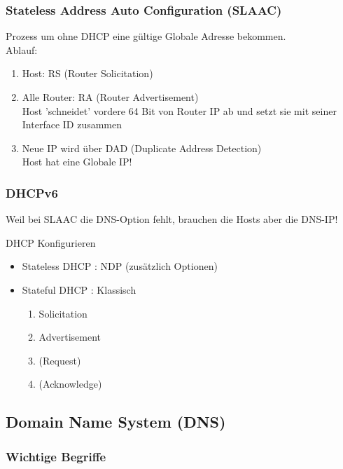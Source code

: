 \documentclass[10pt]{article}
\begin{document}
\subsubsection{Stateless Address Auto Configuration (SLAAC)}

Prozess um ohne DHCP eine gültige Globale Adresse bekommen.\\
Ablauf:
\begin{enumerate}
    \item Host: RS (Router Solicitation)
    \item Alle Router: RA (Router Advertisement)\\
        \textrightarrow\space Host 'schneidet' vordere 64 Bit von Router IP ab und setzt sie mit seiner Interface ID zusammen
    \item Neue IP wird über DAD (Duplicate Address Detection)\\
    \textrightarrow\space Host hat eine Globale IP!
\end{enumerate}


\subsubsection{DHCPv6}

Weil bei SLAAC die DNS-Option fehlt, brauchen die Hosts aber die DNS-IP!

\textrightarrow\space DHCP Konfigurieren
\begin{itemize}
    \item Stateless DHCP : NDP (zusätzlich Optionen)
    \item Stateful DHCP  : Klassisch
        \begin{enumerate}
            \item Solicitation
            \item Advertisement
            \item (Request)
            \item (Acknowledge)
        \end{enumerate}
\end{itemize}

\subsection{Domain Name System (DNS)}

\subsubsection{Wichtige Begriffe}
\end{document}
